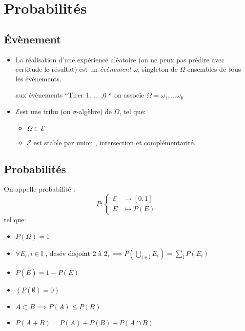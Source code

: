 \documentclass[main.tex]{subfiles}
\begin{document}
\section{Probabilités}
\subsection{Évènement}
\begin{itemize}
\item La réalisation d'une expérience aléatoire (on ne peux pas prédire avec certitude le résultat) est un \textit{évènement} $\omega$, singleton de $\Omega$ ensembles de tous les évènements.
  \begin{exemple}[jet de dé]
    aux évènements    ``Tirer 1, ... ,6 `` on associe $\Omega={\omega_1,...\omega_6}$
  \end{exemple}
\item $\mathcal{E} $est une tribu (ou $\sigma$-algèbre) de $\Omega$, tel que:
  \begin{itemize}
  \item $\Omega \in \mathcal{E}$
  \item $\mathcal{E}$ est stable par union , intersection et complémentarité.
  \end{itemize}
\end{itemize}
\subsection{Probabilités}
\begin{defin}
  On appelle probabilité :
  \[
    P : \begin{cases}
      \mathcal{E} &\to [0,1]\\
      E &\mapsto P(E)
        \end{cases}
   \]
   tel que:

   \begin{itemize}
   \item $    P(\Omega) = 1 $
   \item $ \forall E_i , i\in \mathbb{I} \text{ , desév disjoint 2 à 2}, \implies
     P\left(\displaystyle\bigcup_{i\in\mathbb{I}}E_i\right) = \displaystyle\sum_{\mathbb{I}} P(E_i)$
   \end{itemize}

 \end{defin}

\pagebreak
 \begin{prop}
   \begin{itemize}
   \item  $ P(\bar{E}) = 1-P(E)$
   \item $(P(\emptyset) = 0)$
   \item $A \subset B  \implies P(A) \leq P(B)$
   \item $P(A+B) = P(A)+P(B)-P(A\cap B)$
   \end{itemize}
 \end{prop}
\end{document}
